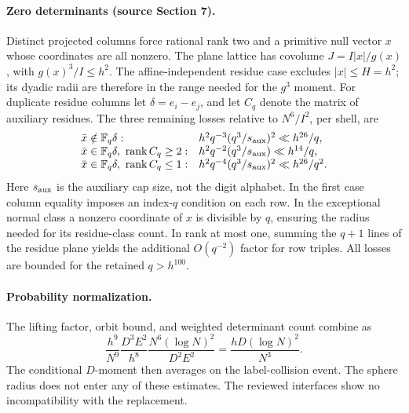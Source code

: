 \documentclass[11pt]{article}
\begin{document}
\paragraph{Zero determinants (source Section 7).}
Distinct projected columns force rational rank two and a primitive
null vector \(x\) whose coordinates are all nonzero. The plane lattice
has covolume \(J=I|x|/g(x)\), with \(g(x)^3/I\le h^2\).
The affine-independent residue case excludes \(|x|\le H=h^2\);
its dyadic radii are therefore in the range needed for the \(g^3\)
moment. For duplicate residue columns let \(\delta=e_i-e_j\),
and let \(C_q\) denote the matrix of auxiliary residues.
The three remaining losses relative to \(N^6/I^2\), per shell, are
\[
\begin{array}{ll}
 \bar x\notin{\mathbb F}_q\delta:
   & h^2q^{-3}(q^3/s_{\rm aux})^2\ll h^{26}/q,\\
 \bar x\in{\mathbb F}_q\delta,\ \operatorname{rank}C_q\ge2:
   & h^2q^{-2}(q^3/s_{\rm aux})\ll h^{14}/q,\\
 \bar x\in{\mathbb F}_q\delta,\ \operatorname{rank}C_q\le1:
   & h^2q^{-4}(q^3/s_{\rm aux})^2\ll h^{26}/q^2 .
\end{array}
\]
Here \(s_{\rm aux}\) is the auxiliary cap size, not the digit alphabet.
In the first case column equality imposes an index-\(q\) condition
on each row. In the exceptional normal class a nonzero coordinate
of \(x\) is divisible by \(q\), ensuring the radius needed for its
residue-class count. In rank at most one, summing the \(q+1\) lines
of the residue plane yields the additional \(O(q^{-2})\) factor
for row triples. All losses are bounded for the retained \(q>h^{100}\).

\paragraph{Probability normalization.}
The lifting factor, orbit bound, and weighted determinant count combine as
\[
 \frac{h^9}{N^9}\frac{D^3E^2}{h^8}
       \frac{N^6(\log N)^2}{D^2E^2}
 =\frac{hD(\log N)^2}{N^3}.
\]
The conditional \(D\)-moment then averages on the label-collision
event. The sphere radius does not enter any of these estimates.
The reviewed interfaces show no incompatibility with the replacement.
\end{document}
